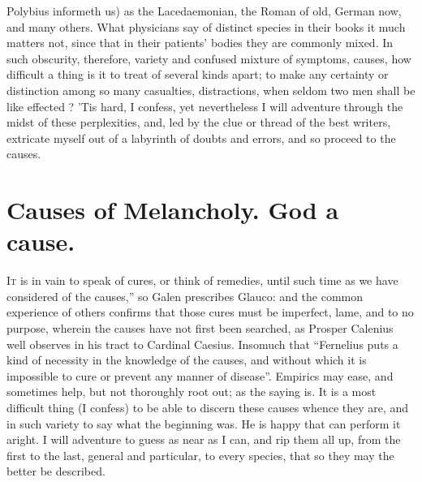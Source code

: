 Polybius informeth us) as the Lacedaemonian, the Roman of
old, German now, and many others. What physicians say of distinct species in
their books it much matters not, since that in their patients' bodies they are
commonly mixed. In such obscurity, therefore, variety and confused mixture of
symptoms, causes, how difficult a thing is it to treat of several kinds apart;
to make any certainty or distinction among so many casualties, distractions,
when seldom two men shall be like effected ? 'Tis hard, I
confess, yet nevertheless I will adventure through the midst of these
perplexities, and, led by the clue or thread of the best writers, extricate
myself out of a labyrinth of doubts and errors, and so proceed to the causes.



\section{Causes of Melancholy. God a cause.}\label{sec:causes-of-melancholy}

\lettrine[ante={\large{}``}]{I}{t} is in vain to speak of cures, or think of remedies,
until such time as we have considered of the causes,'' so
Galen prescribes Glauco: and the common experience of
others confirms that those cures must be imperfect, lame, and to no purpose,
wherein the causes have not first been searched, as
Prosper Calenius well observes in his tract
 to Cardinal Caesius. Insomuch that
\enquote{Fernelius puts a kind of necessity in the knowledge of
the causes, and without which it is impossible to cure or prevent any manner of
disease}. Empirics may ease, and sometimes help, but not thoroughly root out;
 as the saying is. It is a most difficult thing (I confess)
to be able to discern these causes whence they are, and in such
variety to say what the beginning was.
He is happy that can perform it aright. I will adventure
to guess as near as I can, and rip them all up, from the first to the last,
general and particular, to every species, that so they may the better be
described.

